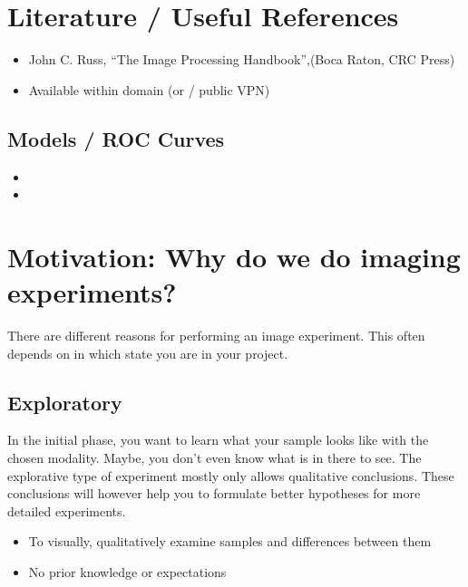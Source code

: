 \documentclass[letterpaper,10pt,english]{sphinxmanual}
\begin{document}
\chapter{Literature / Useful References}
\label{\detokenize{04-BasicSegmentation:literature-useful-references}}\begin{itemize}
\item {} 
\sphinxAtStartPar
John C. Russ, “The Image Processing Handbook”,(Boca Raton, CRC Press)

\item {} 
\sphinxAtStartPar
Available  within domain  (or  / public VPN)

\end{itemize}


\section{Models / ROC Curves}
\label{\detokenize{04-BasicSegmentation:models-roc-curves}}\begin{itemize}
\item {} 
\sphinxAtStartPar
{}

\item {} 
\sphinxAtStartPar
{}

\end{itemize}


\chapter{Motivation:  Why do we do imaging experiments?}
\label{\detokenize{04-BasicSegmentation:motivation-why-do-we-do-imaging-experiments}}
\sphinxAtStartPar
There are different reasons for performing an image experiment. This often depends on in which state you are in your project.


\section{Exploratory}
\label{\detokenize{04-BasicSegmentation:exploratory}}
\sphinxAtStartPar
In the initial phase, you want to learn what your sample looks like with the chosen modality. Maybe, you don’t even know what is in there to see. The explorative type of experiment mostly only allows qualitative conclusions. These conclusions will however help you to formulate better hypotheses for more detailed experiments.
\begin{itemize}
\item {} 
\sphinxAtStartPar
To visually, qualitatively examine samples and differences between them

\item {} 
\sphinxAtStartPar
No prior knowledge or expectations

\end{itemize}
\end{document}
